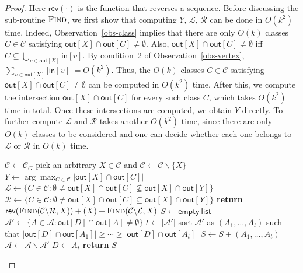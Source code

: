 \documentclass[11pt]{article}
\begin{document}
\begin{proof}
Here $\mathsf{rev}(\cdot)$ is the function that reverses a sequence.
Before discussing the sub-routine $\textsc{Find}$, we first show that computing $Y$, $\mathcal{L}$, $\mathcal{R}$ can be done in $O(k^2)$ time.
Indeed, Observation~\ref{obs-class} implies that there are only $O(k)$ classes $C \in \mathcal{C}$ satisfying $\mathsf{out}[X] \cap \mathsf{out}[C] \neq \emptyset$.
Also, $\mathsf{out}[X] \cap \mathsf{out}[C] \neq \emptyset$ iff $C \subseteq \bigcup_{v \in \mathsf{out}[X]} \mathsf{in}[v]$.
By condition~2 of Observation~\ref{obs-vertex}, $\sum_{v \in \mathsf{out}[X]} |\mathsf{in}[v]| = O(k^2)$.
Thus, the $O(k)$ classes $C \in \mathcal{C}$ satisfying $\mathsf{out}[X] \cap \mathsf{out}[C] \neq \emptyset$ can be computed in $O(k^2)$ time.
After this, we compute the intersection $\mathsf{out}[X] \cap \mathsf{out}[C]$ for every such class $C$, which takes $O(k^2)$ time in total.
Once these intersections are computed, we obtain $Y$ directly.
To further compute $\mathcal{L}$ and $\mathcal{R}$ takes another $O(k^2)$ time, since there are only $O(k)$ classes to be considered and one can decide whether each one belongs to $\mathcal{L}$ or $\mathcal{R}$ in $O(k)$ time.

\begin{algorithm}
    \caption{\textsc{ClassOrder}$(G,\mathcal{C}_G)$}
    \begin{algorithmic}[1]
        \State $\mathcal{C} \leftarrow \mathcal{C}_G$
        \State pick an arbitrary $X \in \mathcal{C}$ and $\mathcal{C} \leftarrow \mathcal{C} \backslash \{X\}$
        \State $Y \leftarrow \arg\max_{C \in \mathcal{C}} |\mathsf{out}[X] \cap \mathsf{out}[C]|$
        \State $\mathcal{L} \leftarrow \{C \in \mathcal{C}: \emptyset \neq \mathsf{out}[X] \cap \mathsf{out}[C] \nsubseteq \mathsf{out}[X] \cap \mathsf{out}[Y]\}$
        \State $\mathcal{R} \leftarrow \{C \in \mathcal{C}: \emptyset \neq \mathsf{out}[X] \cap \mathsf{out}[C] \subseteq \mathsf{out}[X] \cap \mathsf{out}[Y]\}$       
        \State \textbf{return} $\mathsf{rev}(\textsc{Find}(\mathcal{C} \backslash \mathcal{R},X))+(X)+\textsc{Find}(\mathcal{C} \backslash \mathcal{L},X)$
        \medskip
            \State $S \leftarrow \mathsf{empty\ list}$
                \State $\mathcal{A}' \leftarrow \{A \in \mathcal{A}: \mathsf{out}[D] \cap \mathsf{out}[A] \neq \emptyset\}$
                \State $t \leftarrow |\mathcal{A}'|$
                \EndIf                
                \State sort $\mathcal{A}'$ as $(A_1,\dots,A_t)$ such that $|\mathsf{out}[D] \cap \mathsf{out}[A_1]| \geq \cdots \geq |\mathsf{out}[D] \cap \mathsf{out}[A_t]|$
                \State $S \leftarrow S + (A_1,\dots,A_t)$
                \State $\mathcal{A} \leftarrow \mathcal{A} \backslash \mathcal{A}'$
                \State $D \leftarrow A_t$
            \EndWhile
            \State \textbf{return} $S$
        \EndFunction
    \end{algorithmic}
    \label{alg-classorder}
\end{algorithm}


\end{proof}
\end{document}
